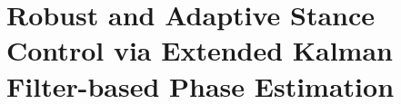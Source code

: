 \chapter{Robust and Adaptive Stance Control via Extended Kalman Filter-based
Phase Estimation}\label{sec:phase_estimation}
